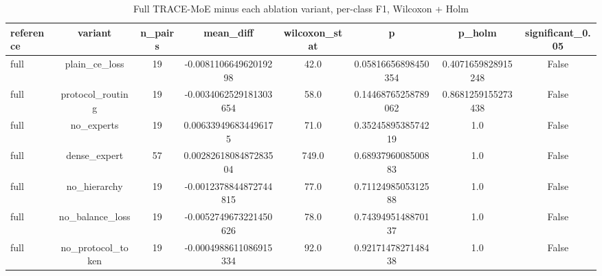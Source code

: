 \begin{table}[htbp]
\centering
\caption{Full TRACE-MoE minus each ablation variant, per-class F1, Wilcoxon + Holm}
\label{tab:ablation_tests}
\begin{tabular}{lccccccc}
\toprule
reference & variant & n\_pairs & mean\_diff & wilcoxon\_stat & p & p\_holm & significant\_0.05 \\
\midrule
full & plain\_ce\_loss & 19 & -0.008110664962019298 & 42.0 & 0.05816656898450354 & 0.4071659828915248 & False \\
full & protocol\_routing & 19 & -0.0034062529181303654 & 58.0 & 0.14468765258789062 & 0.8681259155273438 & False \\
full & no\_experts & 19 & 0.006339496834496175 & 71.0 & 0.3524589538574219 & 1.0 & False \\
full & dense\_expert & 57 & 0.0028261808487283504 & 749.0 & 0.6893796008500883 & 1.0 & False \\
full & no\_hierarchy & 19 & -0.0012378844872744815 & 77.0 & 0.7112498505312588 & 1.0 & False \\
full & no\_balance\_loss & 19 & -0.0052749673221450626 & 78.0 & 0.7439495148870137 & 1.0 & False \\
full & no\_protocol\_token & 19 & -0.0004988611086915334 & 92.0 & 0.9217147827148438 & 1.0 & False \\
\bottomrule
\end{tabular}
\end{table}